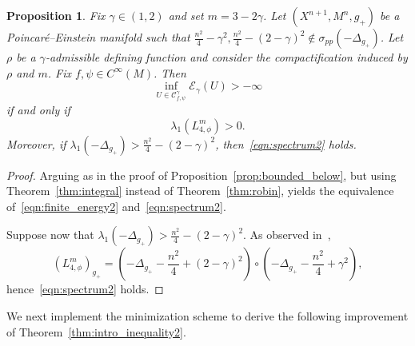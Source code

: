 \documentclass{amsart}
\newtheorem{prop}[thm]{Proposition}
\theoremstyle{definition}
\theoremstyle{remark}
\numberwithin{equation}{section}
\begin{document}
\begin{prop}
\label{prop:bounded_below2}
 Fix $\gamma\in(1,2)$ and set $m=3-2\gamma$.  Let $(X^{n+1},M^n,g_+)$ be a Poincar\'e--Einstein manifold such that $\frac{n^2}{4}-\gamma^2,\frac{n^2}{4}-(2-\gamma)^2\not\in\sigma_{pp}(-\Delta_{g_+})$.  Let $\rho$ be a $\gamma$-admissible defining function and consider the compactification induced by $\rho$ and $m$.  Fix $f,\psi\in C^\infty(M)$.  Then
 \begin{equation}
  \label{eqn:finite_energy2}
  \inf_{U\in{\mathcal{C}}^\gamma_{f,\psi}} {\mathcal{E}}_\gamma(U) > -\infty
 \end{equation}
 if and only if
 \begin{equation}
  \label{eqn:spectrum2}
  \lambda_1\left(L_{4,\phi}^m\right) > 0 .
 \end{equation}
 Moreover, if $\lambda_1(-\Delta_{g_+})>\frac{n^2}{4}-(2-\gamma)^2$, then~\eqref{eqn:spectrum2} holds.
\end{prop}

\begin{proof}
 Arguing as in the proof of Proposition~\ref{prop:bounded_below}, but using Theorem~\ref{thm:integral} instead of Theorem~\ref{thm:robin}, yields the equivalence of~\eqref{eqn:finite_energy2} and~\eqref{eqn:spectrum2}.
 
 Suppose now that $\lambda_1(-\Delta_{g_+})>\frac{n^2}{4}-(2-\gamma)^2$.  As observed in~\cite{CaseChang2013},
 \[ \left(L_{4,\phi}^m\right)_{g_+} = \left(-\Delta_{g_+}-\frac{n^2}{4}+(2-\gamma)^2\right)\circ\left(-\Delta_{g_+}-\frac{n^2}{4}+\gamma^2\right), \]
 hence~\eqref{eqn:spectrum2} holds.
\end{proof}

We next implement the minimization scheme to derive the following improvement of Theorem~\ref{thm:intro_inequality2}.
\end{document}
